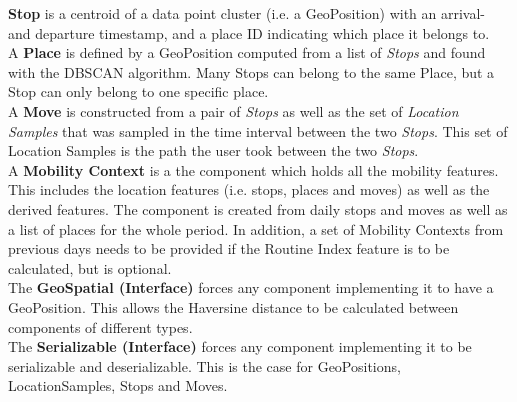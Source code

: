 \textbf{Stop} is a centroid of a data point cluster (i.e. a GeoPosition) with an arrival- and departure timestamp, and a place ID indicating which place it belongs to.\\

A \textbf{Place} is defined by a GeoPosition computed from a list of \textit{Stops} and found with the DBSCAN algorithm. Many Stops can belong to the same Place, but a Stop can only belong to one specific place.\\

A \textbf{Move} is constructed from a pair of \textit{Stops} as well as the set of \textit{Location Samples} that was sampled in the time interval between the two \textit{Stops}. This set of Location Samples is the path the user took between the two \textit{Stops}.\\

A \textbf{Mobility Context} is a the component which holds all the mobility features. This includes the location features (i.e. stops, places and moves) as well as the derived features. The component is created from daily stops and moves as well as a list of places for the whole period. In addition, a set of Mobility Contexts from previous days needs to be provided if the Routine Index feature is to be calculated, but is optional. \\

The \textbf{GeoSpatial (Interface)} forces any component implementing it to have a GeoPosition. This allows the Haversine distance to be calculated between components of different types.\\

The \textbf{Serializable (Interface)} forces any component implementing it to be serializable and deserializable. This is the case for GeoPositions, LocationSamples, Stops and Moves.
